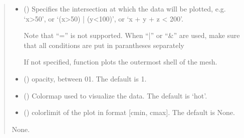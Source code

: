 \documentclass[letterpaper,10pt,english]{sphinxmanual}
\begin{document}
\begin{fulllineitems}
\begin{fulllineitems}
\begin{quote}
\begin{description}
\begin{itemize}
\item {} 
\sphinxAtStartPar
{} (\sphinxstyleliteralemphasis{\sphinxupquote{, }}) \textendash{} 
\sphinxAtStartPar
Specifies the intersection at which the data will be plotted, e.g. ‘x\textgreater{}50’, or ‘(x\textgreater{}50) | (y\textless{}100)’, or ‘x + y + z \textless{} 200’.

\sphinxAtStartPar
Note that “=” is not supported. When “|” or “\&” are used, make sure that all conditions are put in parantheses separately

\sphinxAtStartPar
If not specified, function plots the outermost shell of the mesh.


\item {} 
\sphinxAtStartPar
{} (\sphinxstyleliteralemphasis{\sphinxupquote{, }}) \textendash{} opacity, between 0\sphinxhyphen{}1. The default is 1.

\item {} 
\sphinxAtStartPar
{} (\sphinxstyleliteralemphasis{\sphinxupquote{, }}) \textendash{} Colormap used to visualize the data. The default is ‘hot’.

\item {} 
\sphinxAtStartPar
{} (\sphinxstyleliteralemphasis{\sphinxupquote{, }}) \textendash{} colorlimit of the plot in format {[}cmin, cmax{]}. The default is None.

\end{itemize}

\sphinxAtStartPar
None.

\end{description}\end{quote}

\end{fulllineitems}



\end{fulllineitems}
\end{document}
